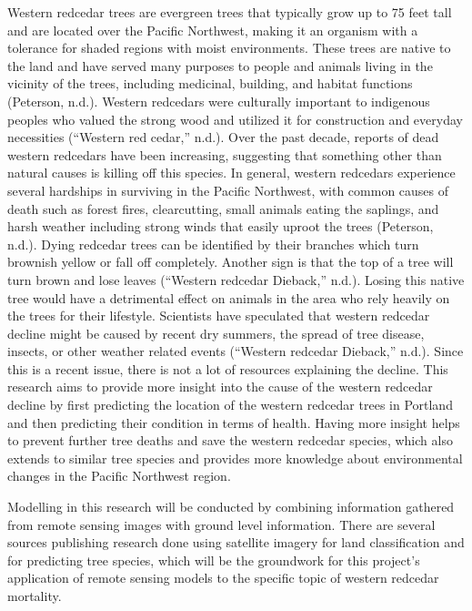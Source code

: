 \documentclass[12pt,twoside]{reedthesis}
\begin{document}
Western redcedar trees are evergreen trees that typically grow up to 75 feet tall and are located over the Pacific Northwest, making it an organism with a tolerance for shaded regions with moist environments. These trees are native to the land and have served many purposes to people and animals living in the vicinity of the trees, including medicinal, building, and habitat functions (Peterson, n.d.). Western redcedars were culturally important to indigenous peoples who valued the strong wood and utilized it for construction and everyday necessities (``Western red cedar,'' n.d.). Over the past decade, reports of dead western redcedars have been increasing, suggesting that something other than natural causes is killing off this species. In general, western redcedars experience several hardships in surviving in the Pacific Northwest, with common causes of death such as forest fires, clearcutting, small animals eating the saplings, and harsh weather including strong winds that easily uproot the trees (Peterson, n.d.). Dying redcedar trees can be identified by their branches which turn brownish yellow or fall off completely. Another sign is that the top of a tree will turn brown and lose leaves (``Western redcedar Dieback,'' n.d.). Losing this native tree would have a detrimental effect on animals in the area who rely heavily on the trees for their lifestyle. Scientists have speculated that western redcedar decline might be caused by recent dry summers, the spread of tree disease, insects, or other weather related events (``Western redcedar Dieback,'' n.d.). Since this is a recent issue, there is not a lot of resources explaining the decline. This research aims to provide more insight into the cause of the western redcedar decline by first predicting the location of the western redcedar trees in Portland and then predicting their condition in terms of health. Having more insight helps to prevent further tree deaths and save the western redcedar species, which also extends to similar tree species and provides more knowledge about environmental changes in the Pacific Northwest region.

Modelling in this research will be conducted by combining information gathered from remote sensing images with ground level information. There are several sources publishing research done using satellite imagery for land classification and for predicting tree species, which will be the groundwork for this project's application of remote sensing models to the specific topic of western redcedar mortality.
\end{document}
